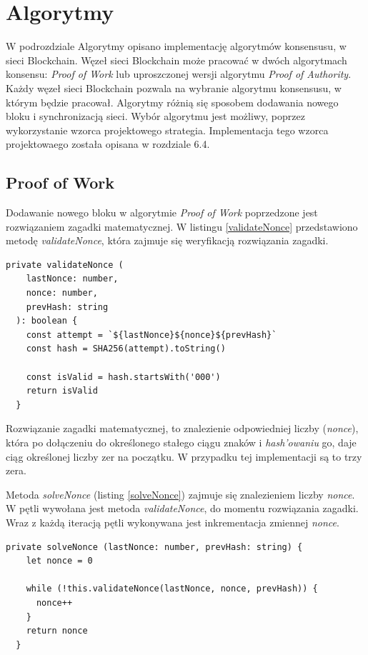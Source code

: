\documentclass[a4paper,12pt]{book}
\begin{document}
\section{Algorytmy}

W podrozdziale Algorytmy opisano implementację algorytmów konsensusu, w sieci Blockchain. Węzeł sieci Blockchain może pracować w dwóch algorytmach konsensu: \textit{Proof of Work} lub uproszczonej wersji algorytmu \textit{Proof of Authority}. Każdy węzeł sieci Blockchain pozwala na wybranie algorytmu konsensusu, w którym będzie pracował. Algorytmy różnią się sposobem dodawania nowego bloku i synchronizacją sieci. Wybór algorytmu jest możliwy, poprzez wykorzystanie wzorca projektowego strategia. Implementacja tego wzorca projektowaego została opisana w rozdziale 6.4.

\subsection{Proof of Work}

Dodawanie nowego bloku w algorytmie \textit{Proof of Work} poprzedzone jest rozwiązaniem zagadki matematycznej. W listingu \ref{validateNonce} przedstawiono metodę \textit{validateNonce}, która zajmuje się weryfikacją rozwiązania zagadki.

\begin{lstlisting}[style=ES6, caption={Metoda \textit{validateNonce}.}, label={validateNonce}]
private validateNonce (
    lastNonce: number,
    nonce: number,
    prevHash: string
  ): boolean {
    const attempt = `${lastNonce}${nonce}${prevHash}`
    const hash = SHA256(attempt).toString()

    const isValid = hash.startsWith('000')
    return isValid
  }
\end{lstlisting}

Rozwiązanie zagadki matematycznej, to znalezienie odpowiedniej liczby (\textit{nonce}), która po dołączeniu do określonego stałego ciągu znaków i \textit{hash’owaniu} go, daje ciąg określonej liczby zer na początku. W przypadku tej implementacji są to trzy zera.
 
Metoda \textit{solveNonce} (listing \ref{solveNonce}) zajmuje się znalezieniem liczby \textit{nonce}. W pętli wywołana jest metoda \textit{validateNonce}, do momentu rozwiązania zagadki. Wraz z każdą iteracją pętli wykonywana jest inkrementacja zmiennej \textit{nonce}.
 
\begin{lstlisting}[style=ES6, caption={Metoda \textit{solveNonce}.}, label={solveNonce}]
private solveNonce (lastNonce: number, prevHash: string) {
    let nonce = 0

    while (!this.validateNonce(lastNonce, nonce, prevHash)) {
      nonce++
    }
    return nonce
  }
\end{lstlisting}
\end{document}
